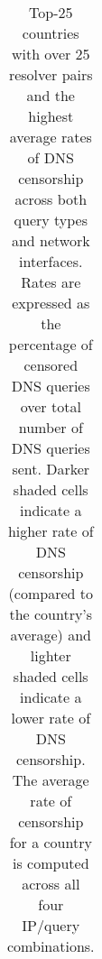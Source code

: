 \begin{table}[t]
{\begin{tabular}{lcccccc}
  \bottomrule
  \end{tabular}
  }
  \caption{
  Top-25 countries with over 25 resolver pairs and the highest average
  rates of DNS censorship across both query types and network interfaces. Rates
  are expressed as the percentage of censored DNS queries over total number of
  DNS queries sent.
  Darker shaded cells indicate a higher rate of DNS censorship (compared to the
  country's average) and lighter shaded cells indicate a lower rate of DNS
  censorship.
  The average rate of censorship for a country is computed across all four
  IP/query combinations.
  }
  \label{tab:prevalence:rates}
\end{table}


